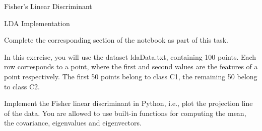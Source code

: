 \documentclass[
	english,
        solution=true
	]{tudaexercise}
\begin{document}
\begin{task}[points=6]{Fisher's Linear Discriminant}
\begin{subtask}[points=3]{}
\end{subtask}


\begin{solution}

\end{solution}
\end{task}

\newpage 

\begin{task}[points=5]{LDA Implementation}
\begin{programmingtaskbox}
Complete the corresponding section of the notebook as part of this task.
\end{programmingtaskbox}
In this exercise, you will use the dataset ldaData.txt, containing 100 points. Each row corresponds to a point, where the first and second values are the features of a point respectively. The first 50 points belong to class C1, the remaining 50 belong to class C2.
\begin{subtask}[points=5]{}
Implement the Fisher linear discriminant in Python, i.e., plot the projection line of the data. You are allowed to use built-in functions for computing the mean, the covariance, eigenvalues and eigenvectors.

\begin{solution}

\end{solution}
\end{subtask}
\end{task}

\clearpage
\end{document}

